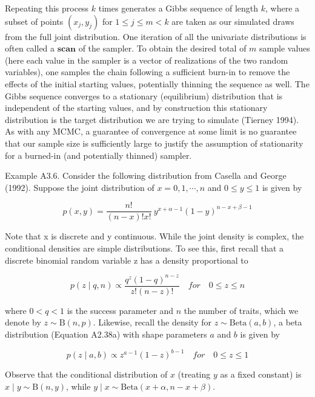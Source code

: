 \documentclass{article}
\begin{document}
Repeating this process $k$ times generates a Gibbs sequence of length $k$, where a subset of points $(x_j, y_j)$ for $1 \leq j \leq m < k$ are taken as our simulated draws from the full joint distribution. One iteration of all the univariate distributions is often called a $\mathbf{scan}$ of the sampler. To obtain the desired total of $m$ sample values (here each value in the sampler is a vector of realizations of the two random variables), one samples the chain following a sufficient burn-in to remove the effects of the initial starting values, potentially thinning the sequence as well. The Gibbs sequence converges to a stationary (equilibrium) distribution that is independent of the starting values, and by construction this stationary distribution is the target distribution we are trying to simulate (Tierney 1994). As with any MCMC, a guarantee of convergence at some limit is no guarantee that our sample size is sufficiently large to justify the assumption of stationarity for a burned-in (and potentially thinned) sampler.

Example A3.6. Consider the following distribution from Casella and George (1992). Suppose the joint distribution of  $ x = 0, 1, \cdots, n $ and  $ 0 \leq y \leq 1 $ is given by

\begin{equation}
p(x,y)=\frac{n!}{(n-x)!x!}\ y^{x+\alpha-1}\left(1-y\right)^{n-x+\beta-1}
\end{equation}

Note that x is discrete and y continuous. While the joint density is complex, the conditional densities are simple distributions. To see this, first recall that a discrete binomial random variable z has a density proportional to

\begin{equation}
p(z\mid q,n)\propto\frac{q^{z}(1-q)^{n-z}}{z!(n-z)!}\quad for\quad0\leq z\leq n
\end{equation}

where  $ 0 < q < 1 $ is the success parameter and  $ n $ the number of traits, which we denote by  $ z \sim \mathrm{B}(n, p) $. Likewise, recall the density for  $ z \sim \mathrm{Beta}(a, b) $, a beta distribution (Equation A2.38a) with shape parameters  $ a $ and  $ b $ is given by

\begin{equation}
p(z\mid a,b)\propto z^{a-1}(1-z)^{b-1}\quad for\quad0\leq z\leq1
\end{equation}

Observe that the conditional distribution of $x$ (treating $y$ as a fixed constant) is $x \mid y \sim \mathrm{B}(n, y)$, while $y \mid x \sim \mathrm{Beta}(x + \alpha, n - x + \beta)$.
\end{document}
